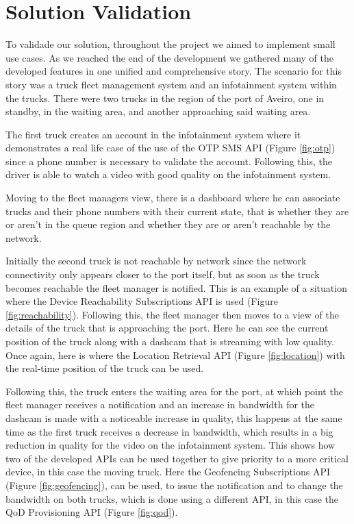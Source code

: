\chapter{Solution Validation}

To validade our solution, throughout the project we aimed to implement small
use cases. As we reached the end of  the development we gathered many of the
developed features in one unified and comprehensive story. The scenario for
this story was a truck fleet management system and an infotainment system
within the trucks. There were two trucks in the region of the port of Aveiro,
one in standby, in the waiting area, and another approaching said waiting area.

The first truck creates an account in the infotainment system where it
demonstrates a real life case of the use of the OTP SMS API (Figure
\ref{fig:otp}) since a phone number is necessary to validate the account.
Following this, the driver is able to watch a video with good quality on the
infotainment system.

Moving to the fleet managers view, there is a dashboard where he can associate
trucks and their phone numbers with their current state, that is whether they
are or aren't in the queue region and whether they are or aren't reachable by
the network.

Initially the second truck is not reachable by network since the network
connectivity only appears closer to the port itself, but as soon as the truck
becomes reachable the fleet manager is notified. This is an example of a
situation where the Device Reachability Subscriptions API is used (Figure
\ref{fig:reachability}). Following this, the fleet manager then moves to a view
of the details of the truck that is approaching the port. Here he can see the
current position of the truck along with a dashcam that is streaming with low
quality. Once again, here is where the Location Retrieval API (Figure
\ref{fig:location}) with the real-time position of the truck can be used.

Following this, the truck enters the waiting area for the port, at which point
the fleet manager receives a notification and an increase in bandwidth for the
dashcam is made with a noticeable increase in quality, this happens at the same
time as the first truck receives a decrease in bandwidth, which results in a
big reduction in quality for the video on the infotainment system. This shows
how two of the developed APIs can be used together to give priority to a more
critical device, in this case the moving truck. Here the Geofencing
Subscriptions API (Figure
\ref{fig:geofencing}), can be used,
to issue the notification and to change the bandwidth on both trucks, which is
done using a different API, in this case the QoD Provisioning API (Figure
\ref{fig:qod}).

